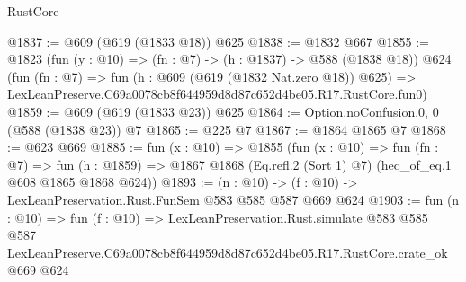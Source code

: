 \begin{lexlean}{RustCore}
\begin{coremodule}
@1837 := @609 (@619 (@1833 @18)) @625
@1838 := @1832 @667
@1855 := @1823
    (fun (y : @10) => (fn : @7) -> (h : @1837) -> @588 (@1838 @18))
    @624
    (fun (fn : @7) =>
    fun (h : @609 (@619 (@1832 Nat.zero @18)) @625) =>
    LexLeanPreserve.C69a0078cb8f644959d8d87c652d4be05.R17.RustCore.fun0)
@1859 := @609 (@619 (@1833 @23)) @625
@1864 := Option.noConfusion.{0, 0} (@588 (@1838 @23)) @7
@1865 := @225 @7
@1867 := @1864 @1865 @7
@1868 := @623 @669
@1885 := fun (x : @10) =>
  @1855
    (fun (x : @10) =>
    fun (fn : @7) =>
    fun (h : @1859) => @1867 @1868 (Eq.refl.{2} (Sort 1) @7) (heq_of_eq.{1} @608 @1865 @1868 @624))
@1893 := (n : @10) -> (f : @10) -> LexLeanPreservation.Rust.FunSem @583 @585 @587 @669 @624
@1903 := fun (n : @10) =>
  fun (f : @10) =>
  LexLeanPreservation.Rust.simulate
    @583
    @585
    @587
    LexLeanPreserve.C69a0078cb8f644959d8d87c652d4be05.R17.RustCore.crate_ok
    @669
    @624
\end{coremodule}
\end{lexlean}
